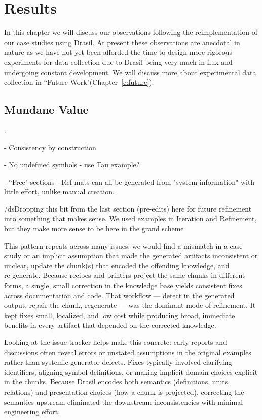 \chapter{Results}
\label{c:results}

In this chapter we will discuss our observations following the reimplementation 
of our case studies using Drasil. At present these observations are 
anecdotal in nature as we have not yet been afforded the time to design more 
rigorous experiments for data collection due to Drasil being very much in flux 
and undergoing constant development. We will discuss more about experimental 
data collection in ``Future Work"(Chapter~\ref{c:future}).

\section {Mundane Value}
.

- Consistency by construction

- No undefined symbols - use Tau example?

- ``Free" sections - Ref mats can all be generated from "system information" 
with little effort, unlike manual creation.

/ds{Dropping this bit from the last section (pre-edits) here for future 
refinement into something that makes sense. We used examples in Iteration and 
Refinement, but they make more sense to be here in the grand scheme}

This pattern repeats across many issues: we would find a mismatch in a 
case study or an implicit assumption that made the generated artifacts 
inconsistent or unclear, update the chunk(s) that encoded the offending 
knowledge, and re‑generate. Because recipes and printers project the same 
chunks in different forms, a single, small correction in the knowledge base 
yields consistent fixes across documentation and code. That workflow — detect 
in the generated output, repair the chunk, regenerate — was the dominant mode 
of refinement. It kept fixes small, localized, and low cost while producing 
broad, immediate benefits in every artifact that depended on the corrected 
knowledge.

Looking at the issue tracker helps make this concrete: early reports and 
discussions often reveal errors or unstated assumptions in the original 
examples rather than systemic generator defects. Fixes typically involved 
clarifying identifiers, aligning symbol definitions, or making implicit domain 
choices explicit in the chunks. Because Drasil encodes both semantics 
(definitions, units, relations) and presentation choices (how a chunk is 
projected), correcting the semantics upstream eliminated the downstream 
inconsistencies with minimal engineering effort.

